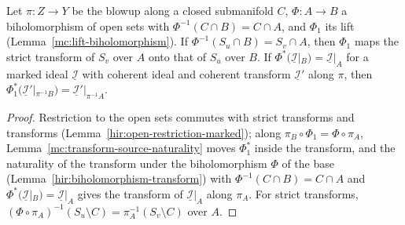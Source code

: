 \begin{lemma}
\label{mc:lift-step}
\leanok
Let \(\pi\colon Z\to Y\) be the blowup along a closed submanifold \(C\), \(\Phi\colon A\to B\) a biholomorphism of open sets with
\(\Phi^{-1}(C\cap B)=C\cap A\), and \(\Phi_1\) its lift (Lemma~\ref{mc:lift-biholomorphism}). If \(\Phi^{-1}(S_u\cap B)=S_v\cap A\), then \(\Phi_1\)
maps the strict transform of \(S_v\) over \(A\) onto that of \(S_u\) over \(B\). If \(\Phi^*(\underline{\mathcal I}|_B)=\underline{\mathcal I}|_A\) for a marked ideal
\(\underline{\mathcal I}\) with coherent ideal and coherent transform \(\underline{\mathcal I}'\) along \(\pi\), then
\(\Phi_1^*(\underline{\mathcal I}'|_{\pi^{-1}B})=\underline{\mathcal I}'|_{\pi^{-1}A}\).
\end{lemma}
\begin{proof}
\leanok
Restriction to the open sets commutes with strict transforms and transforms (Lemma~\ref{hir:open-restriction-marked}); along
\(\pi_B\circ\Phi_1=\Phi\circ\pi_A\), Lemma~\ref{mc:transform-source-naturality} moves \(\Phi_1^*\) inside the transform, and the naturality of the
transform under the biholomorphism \(\Phi\) of the base (Lemma~\ref{hir:biholomorphism-transform}) with \(\Phi^{-1}(C\cap B)=C\cap A\) and
\(\Phi^*(\underline{\mathcal I}|_B)=\underline{\mathcal I}|_A\) gives the transform of \(\underline{\mathcal I}|_A\) along \(\pi_A\). For strict transforms,
\((\Phi\circ\pi_A)^{-1}(S_u\setminus C)=\pi_A^{-1}(S_v\setminus C)\) over \(A\).
\end{proof}

